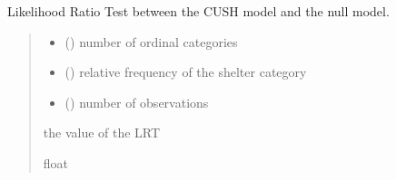 \documentclass[letterpaper,10pt,english]{sphinxmanual}
\begin{document}
\begin{fulllineitems}
\label{\detokenize{cubmods:cubmods.cush.LRT}}
\pysigstartsignatures
{}
\pysigstopsignatures
\sphinxAtStartPar
Likelihood Ratio Test between the CUSH model and
the null model.
\begin{quote}\begin{description}
\begin{itemize}
\item {} 
\sphinxAtStartPar
{} () \textendash{} number of ordinal categories

\item {} 
\sphinxAtStartPar
{} () \textendash{} relative frequency of the shelter category

\item {} 
\sphinxAtStartPar
{} () \textendash{} number of observations

\end{itemize}

\sphinxAtStartPar
the value of the LRT

\sphinxAtStartPar
float

\end{description}\end{quote}

\end{fulllineitems}

\end{document}

